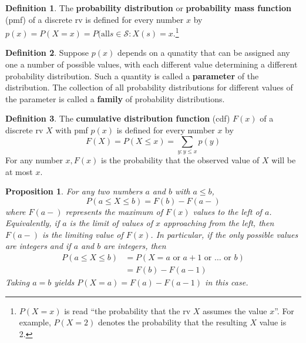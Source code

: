 \documentclass[a4paper]{report}
\theoremstyle{definition}
\newtheorem{definition}{Definition}
\theoremstyle{plain}
\newtheorem{prop}{Proposition}
\begin{document}
\begin{definition}
  The \textbf{probability distribution} or \textbf{probability mass
  function} (pmf) of a discrete rv is defined for every number $x$ by
  $p(x) = P(X = x) = P(\text{all} s\in \mathcal{S} : X(s) =
  x$.\footnote{$P(X = x)$ is read ``the probability that the rv $X$
    assumes the value $x$''. For example, $P(X = 2)$ denotes the
  probability that the resulting $X$ value is 2.}
\end{definition}

\begin{definition}
  Suppose $p(x)$ depends on a qunatity that can be assigned any one a
  number of possible values, with each different value determining a
  different probability distribution. Such a quantity is called a
  \textbf{parameter} of the distribution. The collection of all
  probability distributions for different values of the parameter is
  called a \textbf{family} of probability distributions.
\end{definition}

\begin{definition}
  The \textbf{cumulative distribution function} (cdf) $F(x)$ of a
  discrete rv $X$ with pmf $p(x)$ is defined for every number $x$ by
  \begin{equation*}
    F(X) = P(X \leq x) = \sum\limits_{y:y\leq x} p(y)
  \end{equation*}
  For any number $x, F(x)$ is the probability that the observed value of
  $X$ will be at most $x$.
\end{definition}

\begin{prop}
  For any two numbers $a$ and $b$ with $a \leq b$,
  \begin{equation*}
    P(a \leq X \leq b) = F(b) - F(a-)
  \end{equation*}
  where $F(a-)$ represents the maximum of $F(x)$ values to the left of
  $a$. Equivalently, if $a$ is the limit of values of $x$ approaching
  from the left, then $F(a-)$ is the limiting value of $F(x)$. In
  particular, if the only possible values are integers and if $a$ and
  $b$ are integers, then
  \begin{align*}
    P(a \leq X \leq b) &= P(X = a \text{ or } a+1 \text{ or } \dots \text{ or }
    b) \\
    &= F(b) - F(a-1)
  \end{align*}
  Taking $a = b$ yields $P(X = a) = F(a) - F(a-1)$ in this case.
\end{prop}
\end{document}
